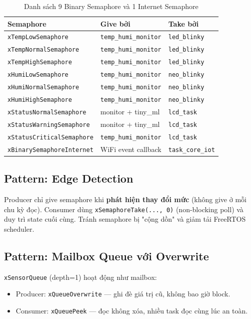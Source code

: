 \documentclass[12pt,a4paper]{article}
\begin{document}
\begin{table}[H]
\centering
\begin{tabular}{|l|l|l|}
\hline
\textbf{Semaphore} & \textbf{Give bởi} & \textbf{Take bởi} \\
\hline
\texttt{xTempLowSemaphore} & \texttt{temp\_humi\_monitor} & \texttt{led\_blinky} \\
\texttt{xTempNormalSemaphore} & \texttt{temp\_humi\_monitor} & \texttt{led\_blinky} \\
\texttt{xTempHighSemaphore} & \texttt{temp\_humi\_monitor} & \texttt{led\_blinky} \\
\texttt{xHumiLowSemaphore} & \texttt{temp\_humi\_monitor} & \texttt{neo\_blinky} \\
\texttt{xHumiNormalSemaphore} & \texttt{temp\_humi\_monitor} & \texttt{neo\_blinky} \\
\texttt{xHumiHighSemaphore} & \texttt{temp\_humi\_monitor} & \texttt{neo\_blinky} \\
\texttt{xStatusNormalSemaphore} & monitor + tiny\_ml & \texttt{lcd\_task} \\
\texttt{xStatusWarningSemaphore} & monitor + tiny\_ml & \texttt{lcd\_task} \\
\texttt{xStatusCriticalSemaphore} & \texttt{temp\_humi\_monitor} & \texttt{lcd\_task} \\
\texttt{xBinarySemaphoreInternet} & WiFi event callback & \texttt{task\_core\_iot} \\
\hline
\end{tabular}
\caption{Danh sách 9 Binary Semaphore và 1 Internet Semaphore}
\end{table}

\subsection{Pattern: Edge Detection}

Producer chỉ give semaphore khi \textbf{phát hiện thay đổi mức} (không give ở mỗi chu kỳ đọc). Consumer dùng \texttt{xSemaphoreTake(..., 0)} (non-blocking poll) và duy trì state cuối cùng. Tránh semaphore bị "cộng dồn" và giảm tải FreeRTOS scheduler.

\subsection{Pattern: Mailbox Queue với Overwrite}

\texttt{xSensorQueue} (depth=1) hoạt động như mailbox:
\begin{itemize}
    \item Producer: \texttt{xQueueOverwrite} — ghi đè giá trị cũ, không bao giờ block.
    \item Consumer: \texttt{xQueuePeek} — đọc không xóa, nhiều task đọc cùng lúc an toàn.
\end{itemize}
\end{document}

